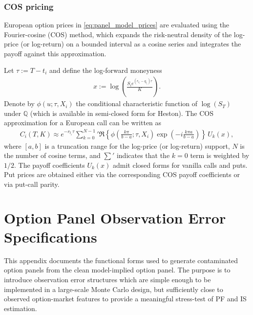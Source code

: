 \documentclass[11pt,a4paper,notitlepage]{article}
\numberwithin{equation}{section}
\begin{document}
\subsubsection{COS pricing}
European option prices in \eqref{eq:panel_model_prices} are evaluated using the Fourier-cosine (COS)
method, which expands the risk-neutral density of the log-price (or log-return) on a bounded interval
as a cosine series and integrates the payoff against this approximation.

Let $\tau:=T-t_i$ and define the log-forward moneyness
\begin{align}
x:=\log\!\left(\frac{S_i e^{(r_{t_i}-q_{t_i})\tau}}{K}\right).
\end{align}
Denote by $\phi(u;\tau,X_i)$ the conditional characteristic function of $\log(S_T)$ under $\mathbb{Q}$
(which is available in semi-closed form for Heston). The COS approximation for a European call can be
written as
\begin{align}
C_i(T,K) \approx e^{-r_{t_i}\tau}\sum_{k=0}^{N-1}{}'
\Re\!\left\{\phi\!\left(\frac{k\pi}{b-a};\tau,X_i\right)\exp\!\left(-i\frac{k\pi a}{b-a}\right)\right\}
\,U_k(x),
\label{eq:COS_call}
\end{align}
where $[a,b]$ is a truncation range for the log-price (or log-return) support, $N$ is the number of cosine
terms, and $\sum'$ indicates that the $k=0$ term is weighted by $1/2$. The payoff coefficients $U_k(x)$
admit closed forms for vanilla calls and puts. Put prices are obtained either via the corresponding COS payoff
coefficients or via put-call parity.

\section{Option Panel Observation Error Specifications}
\label{app:option_noise_specs}

This appendix documents the functional forms used to generate contaminated option panels from the clean model-implied option panel. The purpose is to introduce observation error structures which are simple enough to be implemented in a large-scale Monte Carlo design, but sufficiently close to observed option-market features to provide a meaningful stress-test of PF and IS estimation.
\end{document}
